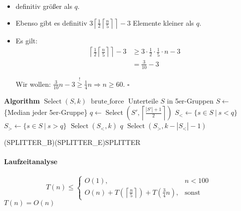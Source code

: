 \begin{description}
\begin{itemize}
		 \item definitiv größer als $q$.
		 \item Ebenso gibt es definitiv $3 \left\lceil\frac{1}{2}\left\lceil\frac{n}{5}\right\rceil\right\rceil - 3$ Elemente kleiner als $q$.
		 \item Es gilt:
				\begin{align*}
				 \left\lceil\frac{1}{2}\left\lceil\frac{n}{5}\right\rceil\right\rceil - 3 &\geq
				3 \cdot \frac{1}{2} \cdot \frac{1}{5} \cdot n - 3 \\
					&= \frac{3}{10} - 3
				\end{align*}
				\begin{center}
				Wir wollen: $\frac{3}{10} n - 3 \overset{!}{\geq} \frac{1}{4} n \Rightarrow n \geq 60$. \hfill$\square$
				\end{center}
			\end{itemize}
		\hspace{2cm}
		\begin{minipage}{0.7\textwidth}
		\begin{algorithmic}
		\STATE \textbf{Algorithm} $\operatorname{Select}(S, k)$
				\STATE $\operatorname{brute\_force}$
			\ENDIF
			\STATE {}\vspace*{-1em}
			\STATE Unterteile $S$ in 5er-Gruppen
			\STATE $S \gets$ \{Median jeder 5er-Gruppe\}
			\STATE {}$q \gets \operatorname{Select}\left(S', \left\lceil\frac{|S'| + 1}{2}\right\rceil\right)$
			\STATE $S_< \gets \{s \in S\ |\ s < q\}$
			\STATE $S_> \gets \{s \in S\ |\ s > q\}$
				\RETURN $\operatorname{Select}(S_<,k)$
				\RETURN $q$
			\ELSE %
				\RETURN $\operatorname{Select}(S_>,k - \left|S_<\right| - 1)$
			\ENDIF
		\end{algorithmic}
		\end{minipage}
		\psbrace*[rot=180,nodesepA=-1.8cm,nodesepB=0.5em](SPLITTER_B)(SPLITTER_E){SPLITTER}
		\paragraph*{Laufzeitanalyse}
		\[T(n) \leq \begin{cases}
		             O(1), & n < 100 \\
					 O(n) + T\left(\left\lceil\frac{n}{5}\right\rceil\right) + T\left(\frac{3}{4} n\right), & \text{sonst}
		            \end{cases}\]
		\Beh $T(n) = O(n)$

\end{description}
